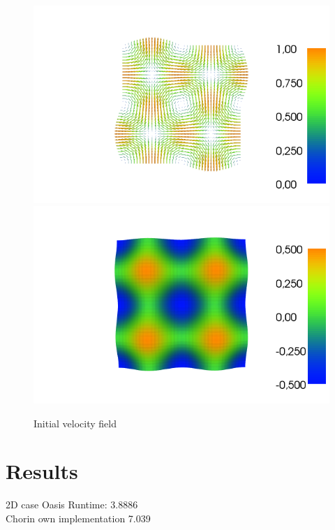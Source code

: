 \documentclass[a4paper,norsk]{article}
\begin{document}
\begin{figure}[h!]
	\centering
	\caption*{Initial velocity field}
	\includegraphics[scale=0.32]{2D/initial.png}
    \includegraphics[scale=0.32]{2D/initpress.png}
\end{figure}


\section*{Results}
2D case Oasis Runtime: 3.8886 \\

Chorin own implementation 7.039
\end{document}
